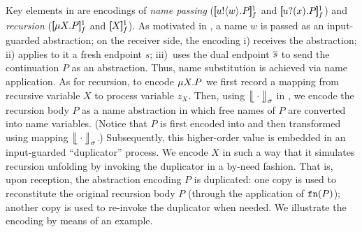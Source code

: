 \documentclass[runningheads]{llncs}
\begin{document}
{{{Key elements in 
 are encodings of 
{\em name passing} ($[\!\![u ! \langle w \rangle . P]\!\!]^1_f$ and $[\!\![u ? (x) . P]\!\!]^1_f$)  and  
{\em recursion} ($[\!\![\mu X. P]\!\!]^1_f$ and $[\!\![X]\!\!]^1_f$).
As motivated in , %
a name $w$ is passed as an input-guarded abstraction;
on the receiver side,
the encoding %
i) receives
the abstraction; ii) applies to it a fresh  endpoint $s$;
iii)~uses the dual endpoint $\overline{s}$ to send the continuation $P$ as an abstraction.
Thus, name substitution is achieved via name application.
As for recursion, to encode $\mu X. P$ we
first record a mapping from recursive variable $X$ to process variable $z_X$.
Then, using 
$\big\lfloor\!\!\big\lfloor\cdot\big\rfloor\!\!\big\rfloor^{}_\sigma$ in 
, we encode the recursion body $P$ as a name abstraction
in which free names of $P$ are converted into name variables.
(Notice that $P$ is first encoded into \HO and then transformed using mapping
$\big\lfloor\!\!\big\lfloor\cdot\big\rfloor\!\!\big\rfloor^{}_\sigma$.)
Subsequently, this higher-order value is embedded in an input-guarded 
``duplicator'' process. We encode $X$ 
in such a way that it
simulates recursion unfolding by 
invoking the duplicator in a by-need fashion.
That is, upon reception, the \HO abstraction encoding  
$P$
is duplicated: 
one copy is used to reconstitute the original recursion body $P$ (through
the application of $\mathtt{fn}(P)$); another copy is used to re-invoke
the duplicator when needed. %
We illustrate the encoding by means of an example.}


 


}}
\end{document}
